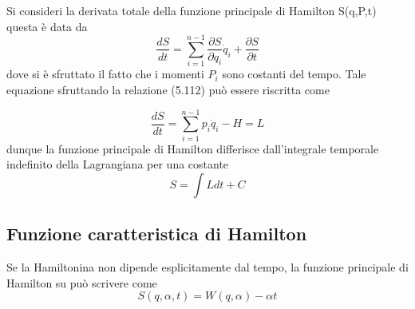 Si consideri la derivata totale della funzione principale di Hamilton S(q,P,t) questa \`{e} data da 
\begin{equation}
	\frac{d S}{d t}= \sum_{i = 1}^{n-1}\frac{\partial S}{\partial q_i} \dot{q}_i+\frac{\partial S}{\partial t}
\end{equation}
dove si \`{e} sfruttato il fatto che i momenti $P_i$ sono costanti del tempo. Tale equazione sfruttando la relazione (5.112) pu\`{o} essere riscritta come 

\begin{equation}
	\frac{d S}{d t}= \sum_{i=1}^{n-1}p_i \dot{q}_i-H=L
\end{equation}
dunque la funzione principale di Hamilton differisce dall'integrale temporale indefinito della Lagrangiana per una costante 
\begin{equation}
	S = \int Ldt + C
\end{equation}

\subsection{Funzione caratteristica di Hamilton}

Se la Hamiltonina non dipende esplicitamente dal tempo, la funzione principale di Hamilton su pu\`{o} scrivere come
\begin{equation}
	S(q,\alpha,t) = W(q,\alpha) - \alpha t
\end{equation}

